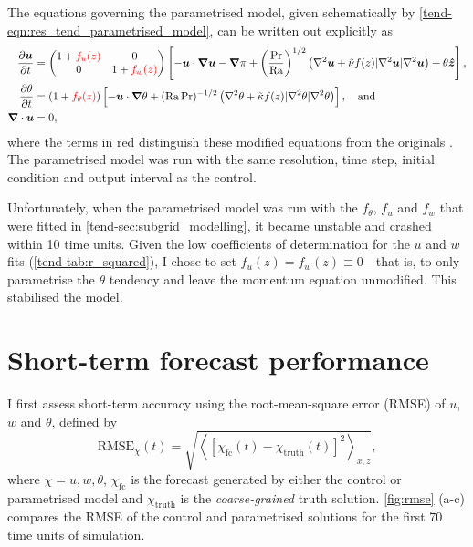 \documentclass[../main.tex]{subfiles}
\begin{document}
The equations governing the parametrised model, given schematically by
\cref{tend-eqn:res_tend_parametrised_model}, can be written out explicitly as
\begin{align*}
    \frac{\partial \bm{u}}{\partial t} &=
        \begin{pmatrix}
            1 + {\color{red} f_u(z)} & 0 \\
            0 & 1 + {\color{red} f_w(z)}
        \end{pmatrix}
        \left[
            -\bm{u} \cdot \bm{\nabla} \bm{u}
            -\bm{\nabla} \pi
            + \left( \frac{\mathrm{Pr}}{\mathrm{Ra}}\right)^{1/2}
            \left(
                \nabla^2 \bm{u}
                + \tilde{\nu} f(z) |\nabla^2 \bm{u}| \nabla^2 \bm{u}
            \right)
            + \theta \bm{\hat{z}}
        \right], \\
    \frac{\partial \theta}{\partial t} &=
        (1 + {\color{red} f_\theta(z)}) \left[
            -\bm{u} \cdot \bm{\nabla} \theta
            + (\mathrm{Ra}\,\mathrm{Pr})^{-1/2}
            \left(
                \nabla^2 \theta
                + \tilde{\kappa} f(z) |\nabla^2 \theta| \nabla^2 \theta
            \right)
        \right], \quad \text{and} \\
    \bm{\nabla} \cdot \bm{u} &= 0,
\end{align*}
where the terms in red distinguish these modified equations from the originals
. The
parametrised model was run with the same resolution, time step, initial
condition and output interval as the control.

Unfortunately, when the parametrised model was run with the $f_\theta$,
$f_u$ and $f_w$ that were fitted in \cref{tend-sec:subgrid_modelling}, it
became unstable and crashed within 10 time units. Given the low coefficients
of determination for the $u$ and $w$ fits (\cref{tend-tab:r_squared}), I
chose to set $f_u(z) = f_w(z) \equiv 0$---that is, to only parametrise the
$\theta$ tendency and leave the momentum equation unmodified. This stabilised
the model.

\newpage
\section{Short-term forecast performance} \label{sec:forecast}

I first assess short-term accuracy using the root-mean-square error (RMSE)
of $u$, $w$ and $\theta$, defined by
\[
    \mathrm{RMSE}_\chi(t) = \sqrt{\left\langle
        [\chi_\mathrm{fc}(t) - \chi_\mathrm{truth}(t)]^2
    \right\rangle _{x,z}},
\]
where $\chi = u, w, \theta$, $\chi_\mathrm{fc}$ is the forecast generated by
either the control or parametrised model and $\chi_\mathrm{truth}$ is the
\emph{coarse-grained} truth solution. \cref{fig:rmse} (a-c) compares the RMSE
of the control and parametrised solutions for the first 70 time units of
simulation.
\end{document}
